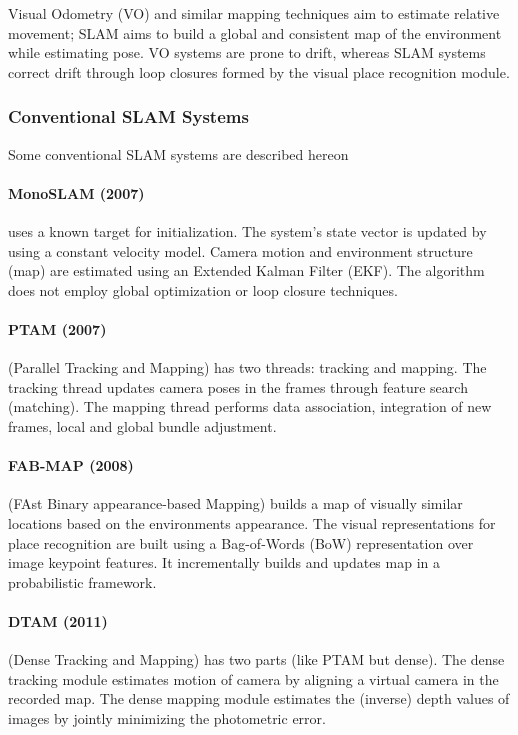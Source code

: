 Visual Odometry (VO) and similar mapping techniques aim to estimate
relative movement; SLAM aims to build a global and consistent map of
the environment while estimating pose. VO systems are prone to drift,
whereas SLAM systems correct drift through loop closures formed by the
visual place recognition module.

\subsubsection{Conventional SLAM Systems}

Some conventional SLAM systems are described hereon

\paragraph{MonoSLAM (2007) \cite{Davison2007MonoSLAMRS}} uses a known
target for initialization. The system's state vector is updated by
using a constant velocity model. Camera motion and environment
structure (map) are estimated using an Extended Kalman Filter (EKF).
The algorithm does not employ global optimization or loop closure
techniques.

\paragraph{PTAM (2007) \cite{Klein2007ParallelTA}} (Parallel Tracking
and Mapping) has two threads: tracking and mapping. The tracking
thread updates camera poses in the frames through feature search
(matching). The mapping thread performs data association, integration
of new frames, local and global bundle adjustment.

\paragraph{FAB-MAP (2008) \cite{Cummins2008FABMAPPL}} (FAst Binary
appearance-based Mapping) builds a map of visually similar locations
based on the environments appearance. The visual representations for
place recognition are built using a Bag-of-Words (BoW) representation
over image keypoint features. It incrementally builds and updates map
in a probabilistic framework.

\paragraph{DTAM (2011) \cite{Newcombe2011DTAMDT}} (Dense Tracking and
Mapping) has two parts (like PTAM but dense). The dense tracking
module estimates motion of camera by aligning a virtual camera in the
recorded map. The dense mapping module estimates the (inverse) depth
values of images by jointly minimizing the photometric error.

